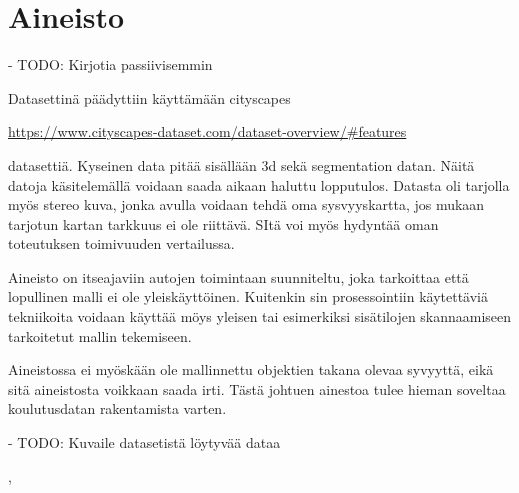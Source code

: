 \chapter{Aineisto}%
\label{ch:aineisto}

- TODO: Kirjotia passiivisemmin

Datasettinä päädyttiin käyttämään  cityscapes 

\url{https://www.cityscapes-dataset.com/dataset-overview/#features}

datasettiä. Kyseinen data pitää sisällään 3d sekä segmentation datan. Näitä datoja käsitelemällä voidaan saada aikaan haluttu lopputulos. Datasta oli tarjolla myös stereo kuva, jonka avulla voidaan tehdä oma sysvyyskartta, jos mukaan tarjotun kartan tarkkuus ei ole riittävä. SItä voi myös hydyntää oman toteutuksen toimivuuden vertailussa.

Aineisto on itseajaviin autojen toimintaan suunniteltu, joka tarkoittaa että lopullinen malli ei ole yleiskäyttöinen. Kuitenkin sin prosessointiin käytettäviä tekniikoita voidaan käyttää möys yleisen tai esimerkiksi sisätilojen skannaamiseen tarkoitetut mallin tekemiseen.

Aineistossa ei myöskään ole mallinnettu objektien takana olevaa syvyyttä, eikä sitä aineistosta voikkaan saada irti. Tästä johtuen ainestoa tulee hieman soveltaa koulutusdatan rakentamista varten.

- TODO: Kuvaile datasetistä löytyvää dataa

\cite{Cordts2016Cityscapes},